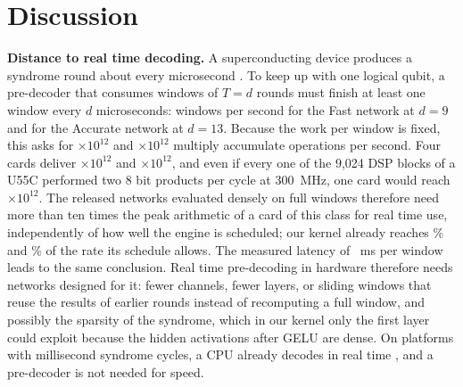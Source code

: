 \section{Discussion}\label{sec:discussion}

\textbf{Distance to real time decoding.} A superconducting device produces a syndrome round about every microsecond
\cite{google2025below}. To keep up with one logical qubit, a pre-decoder that consumes windows of $T=d$ rounds must
finish at least one window every $d$ microseconds: \NumRealTimeWpsFast{} windows per second for the Fast network at
$d=9$ and \NumRealTimeWpsAcc{} for the Accurate network at $d=13$. Because the work per window is fixed, this asks for
\NumRealTimeTmacFast{}$\times10^{12}$ and \NumRealTimeTmacAcc{}$\times10^{12}$ multiply accumulate operations per
second. Four cards deliver \NumTmacFast{}$\times10^{12}$ and \NumTmacAcc{}$\times10^{12}$, and even if every one of the
9{,}024 DSP blocks of a U55C \cite{amd_ds978} performed two 8 bit products per cycle at 300~MHz, one card would reach
\NumDevicePeakTmac{}$\times10^{12}$. The released networks evaluated densely on full windows therefore need more than ten
times the peak arithmetic of a card of this class for real time use, independently of how well the engine is
scheduled; our kernel already reaches \NumModelEffFast{}\% and \NumModelEffAcc{}\% of the rate its schedule allows. The
measured latency of \NumLatFast{}~ms per window leads to the same conclusion. Real time pre-decoding in hardware
therefore needs networks designed for it: fewer channels, fewer layers, or sliding windows that reuse the results of
earlier rounds instead of recomputing a full window, and possibly the sparsity of the syndrome, which in our kernel
only the first layer could exploit because the hidden activations after GELU are dense. On platforms with millisecond
syndrome cycles, a CPU already decodes in real time \cite{ye2026megaquop}, and a pre-decoder is not needed for speed.

